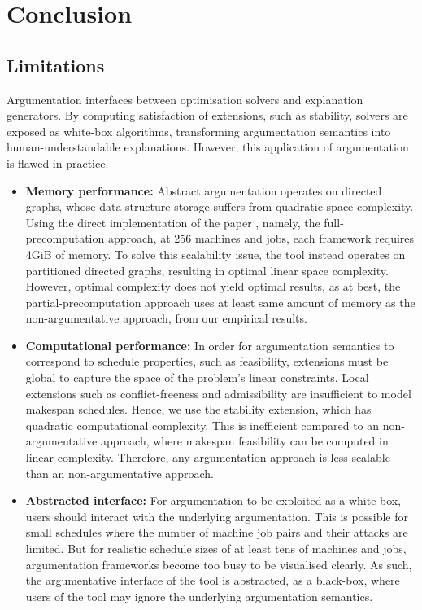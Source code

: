 \chapter{Conclusion}

\section{Limitations}

Argumentation interfaces between optimisation solvers and explanation generators. By computing satisfaction of extensions, such as stability, solvers are exposed as white-box algorithms, transforming argumentation semantics into human-understandable explanations. However, this application of argumentation is flawed in practice. 

\begin{itemize}
	\item\textbf{Memory performance:} Abstract argumentation operates on directed graphs, whose data structure storage suffers from quadratic space complexity. Using the direct implementation of the paper \cite{aes}, namely, the full-precomputation approach, at 256 machines and jobs, each framework requires 4GiB of memory. To solve this scalability issue, the tool instead operates on partitioned directed graphs, resulting in optimal linear space complexity. However, optimal complexity does not yield optimal results, as at best, the partial-precomputation approach uses at least same amount of memory as the non-argumentative approach, from our empirical results.
	\item\textbf{Computational performance:} In order for argumentation semantics to correspond to schedule properties, such as feasibility, extensions must be global to capture the space of the problem's linear constraints. Local extensions such as conflict-freeness and admissibility are insufficient to model makespan schedules. Hence, we use the stability extension, which has quadratic computational complexity. This is inefficient compared to an non-argumentative approach, where makespan feasibility can be computed in linear complexity. Therefore, any argumentation approach is less scalable than an non-argumentative approach.
	\item\textbf{Abstracted interface:} For argumentation to be exploited as a white-box, users should interact with the underlying argumentation. This is possible for small schedules where the number of machine job pairs and their attacks are limited. But for realistic schedule sizes of at least tens of machines and jobs, argumentation frameworks become too busy to be visualised clearly. As such, the argumentative interface of the tool is abstracted, as a black-box, where users of the tool may ignore the underlying argumentation semantics.

\end{itemize}
